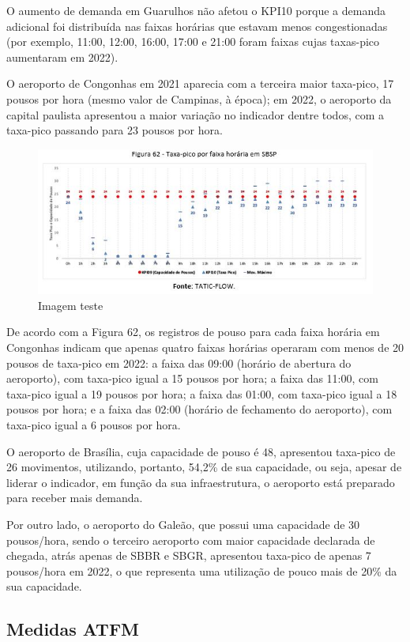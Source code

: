 \documentclass[
]{book}
\begin{document}
O aumento de demanda em Guarulhos não afetou o KPI10 porque a demanda adicional foi distribuída nas faixas horárias que estavam menos congestionadas (por exemplo, 11:00, 12:00, 16:00, 17:00 e 21:00 foram faixas cujas taxas-pico aumentaram em 2022).

O aeroporto de Congonhas em 2021 aparecia com a terceira maior taxa-pico, 17 pousos por hora (mesmo valor de Campinas, à época); em 2022, o aeroporto da capital paulista apresentou a maior variação no indicador dentre todos, com a taxa-pico passando para 23 pousos por hora.

\begin{figure}
\centering
\includegraphics{imagens/fig51.jpg}
\caption{Imagem teste}
\end{figure}

De acordo com a Figura 62, os registros de pouso para cada faixa horária em Congonhas indicam que apenas quatro faixas horárias operaram com menos de 20 pousos de taxa-pico em 2022: a faixa das 09:00 (horário de abertura do aeroporto), com taxa-pico igual a 15 pousos por hora; a faixa das 11:00, com taxa-pico igual a 19 pousos por hora; a faixa das 01:00, com taxa-pico igual a 18 pousos por hora; e a faixa das 02:00 (horário de fechamento do aeroporto), com taxa-pico igual a 6 pousos por hora.

O aeroporto de Brasília, cuja capacidade de pouso é 48, apresentou taxa-pico de 26 movimentos, utilizando, portanto, 54,2\% de sua capacidade, ou seja, apesar de liderar o indicador, em função da sua infraestrutura, o aeroporto está preparado para receber mais demanda.

Por outro lado, o aeroporto do Galeão, que possui uma capacidade de 30 pousos/hora, sendo o terceiro aeroporto com maior capacidade declarada de chegada, atrás apenas de SBBR e SBGR, apresentou taxa-pico de apenas 7 pousos/hora em 2022, o que representa uma utilização de pouco mais de 20\% da sua capacidade.

\hypertarget{medidas-atfm}{%
\subsection{Medidas ATFM}\label{medidas-atfm}}
\end{document}
